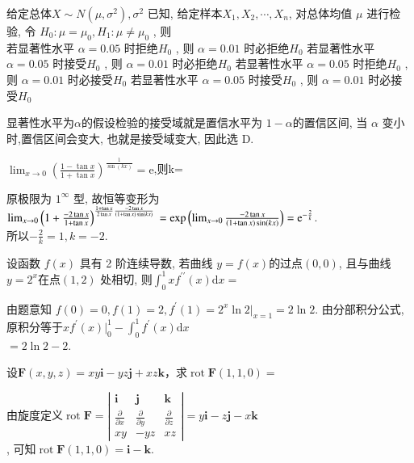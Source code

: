 \documentclass[kindlepaper]{BHCexam4kindle}
\begin{document}
\begin{questions}
		\qs 给定总体$X \sim N\left(\mu, \sigma^{2}\right), \sigma^{2}$ 已知, 
		给定样本$X_{1}, X_{2}, \cdots, X_{n}$, 对总体均值 $\mu$ 进行检验,
		令 $H_{0} : \mu=\mu_{0}, H_{1} : \mu \neq \mu_{0}$ , 则\xx\\
		\fourch
		{若显著性水平 $\alpha=0.05$ 时拒绝$H_{0}$ , 则  $\alpha=0.01$ 时必拒绝$H_{0}$}
		{若显著性水平 $\alpha=0.05$ 时接受$H_{0}$ , 则  $\alpha=0.01$ 时必拒绝$H_{0}$}
		{若显著性水平 $\alpha=0.05$ 时拒绝$H_{0}$ , 则  $\alpha=0.01$ 时必接受$H_{0}$}
		{若显著性水平 $\alpha=0.05$ 时接受$H_{0}$ , 则  $\alpha=0.01$ 时必接受$H_{0}$}
		\begin{solution}
			显著性水平为$\alpha$的假设检验的接受域就是置信水平为 $1-\alpha$的置信区间, 
			当 $\alpha$ 变小时,置信区间会变大, 也就是接受域变大, 因此选 D.
		\end{solution}

		\qs $\lim _{x \rightarrow 0}\left(\frac{1-\tan x}{1+\tan x}\right)^{\frac{1}{\sin (k x)}}=\mathrm{e}$,则k=\tk
		\begin{solution}
			原极限为 $1^{\infty}$ 型, 故恒等变形为\\
			$\lim _{x \rightarrow 0}\left(1+\frac{-2 \tan x}{1+\tan x}\right)^{\frac{1+\tan x}{2 \tan x} \frac{-2 \tan x}{(1+\tan x) \sin (k x)}}\\
			=\exp \left(\lim _{x \rightarrow 0} \frac{-2 \tan x}{(1+\tan x) \sin (k x)}\right)=\mathrm{e}^{-\frac{2}{k}}$.\\
			所以$-\frac{2}{k}=1, k=-2$.

		\end{solution}

		\qs 设函数 $f(x)$ 具有 2 阶连续导数,
		若曲线 $y=f(x)$的过点$(0,0)$, 且与曲线$y=2^{x}$在点$(1,2)$ 处相切, 则$\int_{0}^{1} x f^{\prime \prime}(x) \mathrm{d} x=$\xx\\
		\begin{solution}
			由题意知 $f(0)=0, f(1)=2, f^{\prime}(1)=2^{x} \ln \left.2\right|_{x=1}=2 \ln 2$. 
			由分部积分公式, 原积分等于$x f^{\prime}\left.(x)\right|_{0} ^{1}-\int_{0}^{1} f^{\prime}(x) \mathrm{d} x$\\
			$=2 \ln 2-2$.
		\end{solution}

		\qs 设$\boldsymbol{F}(x, y, z)=x y \boldsymbol{i}-y z \boldsymbol{j}+x z \boldsymbol{k}$，求$\operatorname{rot} \boldsymbol{F}(1,1,0)=$\xx\\
		\begin{solution}
		由旋度定义$\operatorname{rot} \boldsymbol{F}=\left|\begin{array}{ccc}{\boldsymbol{i}} & {\boldsymbol{j}} & {\boldsymbol{k}} \\ {\frac{\partial}{\partial x}} & {\frac{\partial}{\partial y}} & {\frac{\partial}{\partial z}} \\ {x y} & {-y z} & {x z}\end{array}\right|=y \boldsymbol{i}-z \boldsymbol{j}-x \boldsymbol{k}$\\
			, 可知$\operatorname{rot} \boldsymbol{F}(1,1,0)=\boldsymbol{i}-\boldsymbol{k}$.
		\end{solution}



\end{questions}
\end{document}
